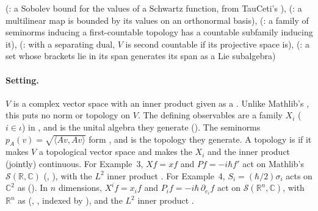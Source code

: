 \documentclass[11pt]{article}
\begin{document}
\begin{itemize}
  (: a Sobolev bound for the values of a Schwartz
  function, from TauCeti's ),\newline
  \newline
  (: a multilinear map is bounded
  by its values on an orthonormal basis),\newline
  (: a family of seminorms inducing a first-countable
  topology has a countable subfamily inducing it),\newline
  (: with a separating dual, $V$ is second
  countable if its projective space is),\newline
  (: a set whose brackets lie in its
  span generates its span as a Lie subalgebra)
\end{itemize}

\paragraph{Setting.} $V$ is a complex vector space with an inner product given as a
. Unlike Mathlib's , this puts no norm
or topology on $V$. The defining observables are a family $X_i$ ($i \in \iota$) in
, and  is the unital algebra they generate
(). The seminorms
$p_A(v) = \sqrt{\langle Av, Av\rangle}$ form , and 
is the topology they generate. A topology is  if it makes $V$ a topological
vector space and makes the $X_i$ and the inner product (jointly) continuous. For Example~3,
$X f = x f$ and $P f = -i\hbar f'$ act on Mathlib's $\mathcal{S}(\mathbb{R}, \mathbb{C})$
(, ), with the $L^2$ inner product . For Example~4,
$S_i = (\hbar/2)\sigma_i$ acts on $\mathbb{C}^2$ as  ().
In $n$ dimensions, $X^i f = x_i f$ and $P_i f = -i\hbar\, \partial_{e_i} f$ act on
$\mathcal{S}(\mathbb{R}^n, \mathbb{C})$, with $\mathbb{R}^n$ as 
(, , indexed by ), and the $L^2$ inner product
.
\end{document}
